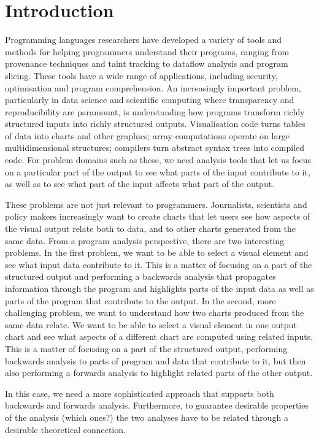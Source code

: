 \section{Introduction}

Programming languages researchers have developed a variety of tools and methods for helping programmers understand their programs, ranging from provenance techniques and taint tracking to dataflow analysis and program slicing. These tools have a wide range of applications, including security, optimisation and program comprehension. An increasingly important problem, particularly in data science and scientific computing where transparency and reproducibility are paramount, is understanding how programs transform richly structured inputs into richly structured outputs. Visualisation code turns tables of data into charts and other graphics; array computations operate on large multidimensional structures; compilers turn abstract syntax trees into compiled code. For problem domains such as these, we need analysis tools that let us focus on a particular part of the output to see what parts of the input contribute to it, as well as to see what part of the input affects what part of the output. 

These problems are not just relevant to programmers. Journalists, scientists and policy makers increasingly want to create charts that let users see how aspects of the visual output relate both to data, and to other charts generated from the same data. From a program analysis perspective, there are two interesting problems. In the first problem, we want to be able to select a visual element and see what input data contribute to it. This is a matter of focusing on a part of the structured output and performing a backwards analysis that propagates information through the program and highlights parts of the input data as well as parts of the program that contribute to the output. In the second, more challenging problem, we want to understand how two charts produced from the same data relate. We want to be able to select a visual element in one output chart and see what aspects of a different chart are computed using related inputs. This is a matter of focusing on a part of the structured output, performing backwards analysis to parts of program and data that contribute to it, but then also performing a forwards analysis to highlight related parts of the other output.

In this case, we need a more sophisticated approach that supports both backwards and forwards analysis. Furthermore, to guarantee desirable properties of the analysis (which ones?) the two analyses have to be related through a desirable theoretical connection.


